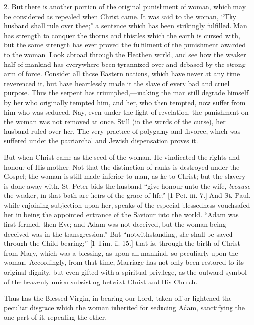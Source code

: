 2. But there is another portion of the original punishment of woman,
which may be considered as repealed when Christ came. It was said to the
woman, ``Thy husband shall rule over thee;'' a sentence which
has been strikingly fulfilled. Man has strength to conquer the thorns
and thistles which the earth is cursed with, but the same strength has
ever proved the fulfilment of the punishment awarded to the woman. Look
abroad through the Heathen world, and see how the weaker half of mankind
has everywhere been tyrannized over and debased by the strong arm of
force. Consider all those Eastern nations, which have never at any time
reverenced it, but have heartlessly made it the slave of every bad and
cruel purpose. Thus the serpent has triumphed,—making the man still
degrade himself by her who originally tempted him, and her, who then
tempted, now suffer from him who was seduced. Nay, even under the light
of revelation, the punishment on the woman was not removed at once.
Still (in the words of the curse), her husband ruled over her. The very
practice of polygamy and divorce, which was suffered under the
patriarchal and Jewish dispensation proves it.

But when Christ came as the seed of the woman, He vindicated the
rights and honour of His mother. Not that the distinction of ranks is
destroyed under the Gospel; the woman is still made inferior to man, as
he to Christ; but the slavery is done away with. St. Peter bids the
husband ``give honour unto the wife, \emph{because} the weaker, in
that both are heirs of the grace of life.'' [1 Pet. iii. 7.] And St.
Paul, while enjoining subjection upon her, speaks of the especial
blessedness vouchsafed her in being the appointed entrance of the
Saviour into the world. ``Adam was first formed, then Eve; and Adam
was not deceived, but the woman being deceived was in the
transgression.'' But ``notwithstanding, she shall be saved
through the Child-bearing;'' [1 Tim. ii. 15.] that is, through the
birth of Christ from Mary, which was a blessing, as upon all mankind, so
peculiarly upon the woman. Accordingly, from that time, Marriage has not
only been restored to its original dignity, but even gifted with a
spiritual privilege, as the outward symbol of the heavenly union
subsisting betwixt Christ and His Church.

Thus has the Blessed Virgin, in bearing our Lord, taken off or
lightened the peculiar disgrace which the woman inherited for seducing
Adam, sanctifying the one part of it, repealing the other.

